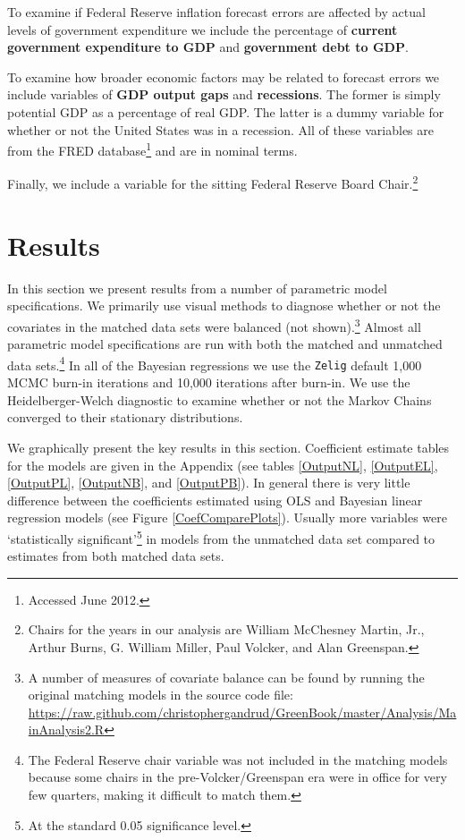\documentclass[a4paper]{article}\usepackage{graphicx, color}
\begin{document}
To examine if Federal Reserve inflation forecast errors are affected by actual levels of government expenditure we include the percentage of {\bf{current government expenditure to GDP}} and {\bf{government debt to GDP}}. 

To examine how broader economic factors may be related to forecast errors we include variables of {\bf{GDP output gaps}} and {\bf{recessions}}. The former is simply potential GDP as a percentage of real GDP. The latter is a dummy variable for whether or not the United States was in a recession. All of these variables are from the FRED database\footnote{Accessed June 2012.} and are in nominal terms. 

Finally, we include a variable for the sitting Federal Reserve Board Chair.\footnote{Chairs for the years in our analysis are William McChesney Martin, Jr., Arthur Burns, G. William Miller, Paul Volcker, and Alan Greenspan.}

\section{Results}

In this section we present results from a number of parametric model specifications. We primarily use visual methods to diagnose whether or not the covariates in the matched data sets were balanced (not shown).\footnote{A number of measures of covariate balance can be found by running the original matching models in the source code file: {\url{https://raw.github.com/christophergandrud/GreenBook/master/Analysis/MainAnalysis2.R}}}  Almost all parametric model specifications are run with both the matched and unmatched data sets.\footnote{The Federal Reserve chair variable was not included in the matching models because some chairs in the pre-Volcker/Greenspan era were in office for very few quarters, making it difficult to match them.} In all of the Bayesian regressions we use the {\tt{Zelig}} default 1,000 MCMC burn-in iterations and 10,000 iterations after burn-in. We use the Heidelberger-Welch diagnostic to examine whether or not the Markov Chains converged to their stationary distributions.

We graphically present the key results in this section. Coefficient estimate tables for the models are given in the Appendix (see tables \ref{OutputNL}, \ref{OutputEL}, \ref{OutputPL}, \ref{OutputNB}, and \ref{OutputPB}). In general there is very little difference between the coefficients estimated using OLS and Bayesian linear regression models (see Figure \ref{CoefComparePlots}). Usually more variables were `statistically significant'\footnote{At the standard 0.05 significance level.} in models from the unmatched data set compared to estimates from both matched data sets.
\end{document}
